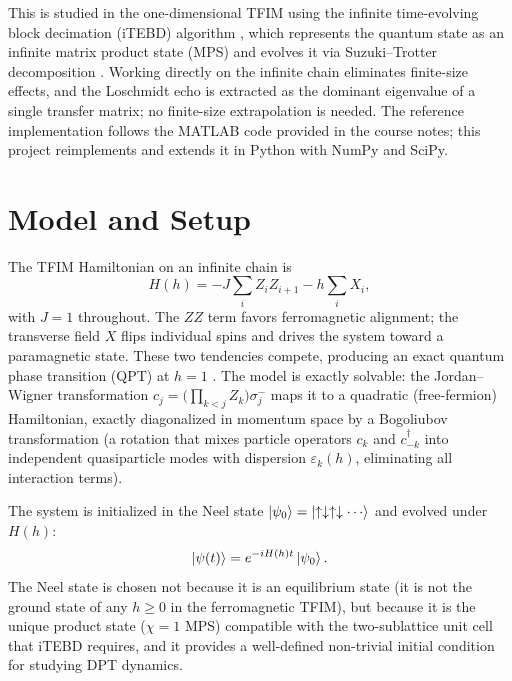 \documentclass[11pt,a4paper]{article}
\begin{document}
This is studied in the one-dimensional TFIM using the infinite time-evolving
block decimation (iTEBD) algorithm \cite{vidal2007}, which represents the
quantum state as an infinite matrix product state (MPS) and evolves it via
Suzuki--Trotter decomposition \cite{suzuki1976,hatano2005}. Working directly on the
infinite chain eliminates finite-size effects, and the Loschmidt echo is
extracted as the dominant eigenvalue of a single transfer matrix; no
finite-size extrapolation is needed. The reference implementation follows the
MATLAB code provided in the course notes; this project reimplements and extends
it in Python with NumPy and SciPy.

\section{Model and Setup}
\label{sec:model}

The TFIM Hamiltonian on an infinite chain is
\begin{equation}
  H(h) = -J\sum_{i} Z_i Z_{i+1} - h\sum_{i} X_i,
  \label{eq:tfim}
\end{equation}
with $J=1$ throughout. The $ZZ$ term favors ferromagnetic alignment; the
transverse field $X$ flips individual spins and drives the system toward a
paramagnetic state. These two tendencies compete, producing an exact quantum
phase transition (QPT) at $h=1$ \cite{sachdev2011}. The model is exactly
solvable: the Jordan--Wigner transformation $c_j = \bigl(\prod_{k<j}Z_k\bigr)\sigma^-_j$
maps it to a quadratic (free-fermion) Hamiltonian, exactly diagonalized
in momentum space by a Bogoliubov transformation (a rotation that mixes
particle operators $c_k$ and $c_{-k}^\dagger$ into independent quasiparticle
modes with dispersion $\varepsilon_k(h)$, eliminating all interaction terms).

The system is initialized in the Neel state $\ket{\psi_0} = \ket{\uparrow\downarrow\uparrow\downarrow\cdots}$
and evolved under $H(h)$:
\begin{equation}
  \ket{\psi(t)} = e^{-iH(h)t}\ket{\psi_0}.
\end{equation}
The Neel state is chosen not because it is an equilibrium state (it is not
the ground state of any $h\geq 0$ in the ferromagnetic TFIM), but because it
is the unique product state ($\chi=1$ MPS) compatible with the two-sublattice
unit cell that iTEBD requires, and it provides a well-defined non-trivial
initial condition for studying DPT dynamics.
\end{document}
